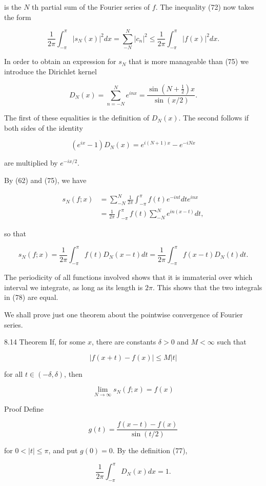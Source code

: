 \documentclass[10pt]{article}
\begin{document}
is the $N$ th partial sum of the Fourier series of $f$. The inequality (72) now takes the form

$$
\frac{1}{2 \pi} \int_{-\pi}^{\pi}\left|s_{N}(x)\right|^{2} d x=\sum_{-N}^{N}\left|c_{n}\right|^{2} \leq \frac{1}{2 \pi} \int_{-\pi}^{\pi}|f(x)|^{2} d x .
$$

In order to obtain an expression for $s_{N}$ that is more manageable than (75) we introduce the Dirichlet kernel

$$
D_{N}(x)=\sum_{n=-N}^{N} e^{i n x}=\frac{\sin \left(N+\frac{1}{2}\right) x}{\sin (x / 2)} .
$$

The first of these equalities is the definition of $D_{N}(x)$. The second follows if both sides of the identity

$$
\left(e^{i x}-1\right) D_{N}(x)=e^{i(N+1) x}-e^{-i N x}
$$

are multiplied by $e^{-i x / 2}$.

By (62) and (75), we have

$$
\begin{aligned}
s_{N}(f ; x) & =\sum_{-N}^{N} \frac{1}{2 \pi} \int_{-\pi}^{\pi} f(t) e^{-i n t} d t e^{i n x} \\
& =\frac{1}{2 \pi} \int_{-\pi}^{\pi} f(t) \sum_{-N}^{N} e^{i n(x-t)} d t,
\end{aligned}
$$

so that

$$
s_{N}(f ; x)=\frac{1}{2 \pi} \int_{-\pi}^{\pi} f(t) D_{N}(x-t) d t=\frac{1}{2 \pi} \int_{-\pi}^{\pi} f(x-t) D_{N}(t) d t .
$$

The periodicity of all functions involved shows that it is immaterial over which interval we integrate, as long as its length is $2 \pi$. This shows that the two integrals in (78) are equal.

We shall prove just one theorem about the pointwise convergence of Fourier series.

8.14 Theorem If, for some $x$, there are constants $\delta>0$ and $M<\infty$ such that

$$
|f(x+t)-f(x)| \leq M|t|
$$

for all $t \in(-\delta, \delta)$, then

$$
\lim _{N \rightarrow \infty} s_{N}(f ; x)=f(x)
$$

Proof Define

$$
g(t)=\frac{f(x-t)-f(x)}{\sin (t / 2)}
$$

for $0<|t| \leq \pi$, and put $g(0)=0$. By the definition (77),

$$
\frac{1}{2 \pi} \int_{-\pi}^{\pi} D_{N}(x) d x=1 .
$$
\end{document}
